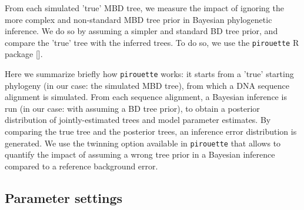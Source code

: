 From each simulated 'true' MBD tree, we measure the impact of
ignoring the more complex and non-standard MBD tree prior in
Bayesian phylogenetic inference.
We do so by assuming a simpler and standard BD tree prior,
and compare the 'true' tree with the inferred trees.
To do so, we use the \verb;pirouette; R package [\citep{pirouette}].

Here we summarize briefly how \verb;pirouette; works: it starts from a 'true' starting phylogeny (in our case: the simulated MBD tree), from which a DNA sequence alignment is simulated. 
From each sequence alignment, a Bayesian inference is run (in our case: with assuming a BD tree prior), to obtain a posterior distribution of jointly-estimated trees and model parameter estimates.
By comparing the true tree and the posterior trees, an inference error distribution is generated.
We use the twinning option available in \verb;pirouette; that allows to quantify the impact of assuming a wrong tree prior in a Bayesian inference compared to a reference background error.

\subsection{Parameter settings}

\iffalse
We ran multiple pilot experiments with 1 replicate to arrive at our final
parameter settings. We devised a set of rules to make a verdict about the
settings \richel{(script at \url{https://github.com/richelbilderbeek/razzo_project/blob/master/scripts/90_collect_run_times.R},
resulting verdicts at \url{https://github.com/richelbilderbeek/razzo_project/blob/master/verdict.md})}:
\itemize{
  \item quality: 95\% of all individual runs should have an ESS of at least 200.
    \richel{figure \ref{fig:esses}}
  \item feasibility: 95\% of all individual runs should finish within 10 days.
    \richel{figure \ref{fig:runtimes}}
  \item reproducibility: the mean run-time of all finished runs should be less than 24 hours 
    \richel{I suggest}.
    \richel{figure \ref{fig:runtimes}}
  \item relevance 1: the percentage of taxa created by the MB process should be
    as high as possible
  \item relevance 2: the percentage of taxa should be
    as high as possible
}
We searched through parameter space until these criteria were met.
All the parameter settings used in the pilot experiments can be found at 
\url{https://github.com/richelbilderbeek/razzo_project/blob/master/overview.md}.
Due to the low number of replicates, we were unable (nor tried)
to draw conclusions based on the results.
\fi


